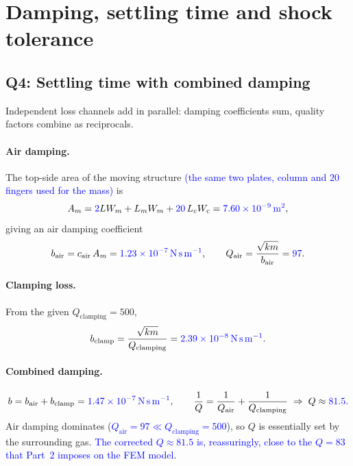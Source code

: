 \section{Damping, settling time and shock tolerance}

\subsection*{Q4: Settling time with combined damping}

Independent loss channels add in parallel: damping coefficients sum, quality
factors combine as reciprocals.

\paragraph{Air damping.} The top-side area of the moving structure
\textcolor{blue}{(the same two plates, column and $20$ fingers used for the
mass)} is
\begin{equation}
  A_{m}=\textcolor{blue}{2}L W_{m} + L_{m} W_{m} + \textcolor{blue}{20}\, L_{c} W_{c}
      = \textcolor{blue}{\SI{7.60e-9}{\meter\squared}},
\end{equation}
giving an air damping coefficient
\begin{equation}
  b_{\mathrm{air}}=c_{\mathrm{air}}\,A_{m}=\textcolor{blue}{\SI{1.23e-7}{\newton\second\per\meter}},
  \qquad
  Q_{\mathrm{air}}=\frac{\sqrt{km}}{b_{\mathrm{air}}}=\textcolor{blue}{97}.
\end{equation}

\paragraph{Clamping loss.} From the given $Q_{\mathrm{clamping}}=500$,
\begin{equation}
  b_{\mathrm{clamp}}=\frac{\sqrt{km}}{Q_{\mathrm{clamping}}}
                   =\textcolor{blue}{\SI{2.39e-8}{\newton\second\per\meter}}.
\end{equation}

\paragraph{Combined damping.}
\begin{equation}
  b=b_{\mathrm{air}}+b_{\mathrm{clamp}}=\textcolor{blue}{\SI{1.47e-7}{\newton\second\per\meter}},
  \qquad
  \frac{1}{Q}=\frac{1}{Q_{\mathrm{air}}}+\frac{1}{Q_{\mathrm{clamping}}}
  \;\Rightarrow\; Q\approx \textcolor{blue}{81.5}.
\end{equation}
Air damping dominates (\textcolor{blue}{$Q_{\mathrm{air}}\!=\!97 \ll Q_{\mathrm{clamping}}\!=\!500$}),
so $Q$ is essentially set by the surrounding gas.
\textcolor{blue}{The corrected $Q\approx81.5$ is, reassuringly, close to the
$Q=83$ that Part~2 imposes on the FEM model.}


